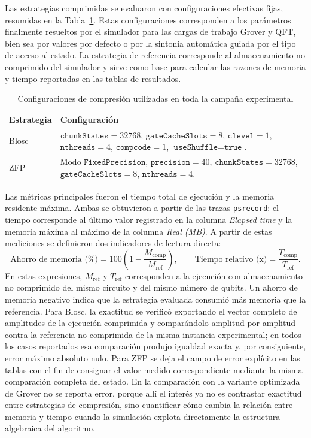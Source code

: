 Las estrategias comprimidas se evaluaron con configuraciones efectivas fijas, resumidas en la
Tabla~\ref{tab:exp-configs}. Estas configuraciones corresponden a los parámetros finalmente
resueltos por el simulador para las cargas de trabajo Grover y QFT, bien sea por valores por
defecto o por la sintonía automática guiada por el tipo de acceso al estado. La estrategia de referencia corresponde al almacenamiento no
comprimido del simulador y sirve como base para calcular las razones de memoria y tiempo
reportadas en las tablas de resultados.

\begin{table}[H]
    \centering
    \small
    \caption{Configuraciones de compresión utilizadas en toda la campaña experimental}
    \label{tab:exp-configs}
    \begin{tabular}{>{\raggedright\arraybackslash}p{2.1cm}>{\raggedright\arraybackslash}p{9.2cm}}
        \hline
        \textbf{Estrategia} & \textbf{Configuración} \\
        \hline
        Blosc & $\texttt{chunkStates}=32768$, $\texttt{gateCacheSlots}=8$, $\texttt{clevel}=1$, $\texttt{nthreads}=4$, $\texttt{compcode}=1$, $\texttt{useShuffle}=\texttt{true}$. \\
        ZFP & Modo $\texttt{FixedPrecision}$, $\texttt{precision}=40$, $\texttt{chunkStates}=32768$, $\texttt{gateCacheSlots}=8$, $\texttt{nthreads}=4$. \\
        \hline
    \end{tabular}
\end{table}

Las métricas principales fueron el tiempo total de ejecución y la memoria residente máxima.
Ambas se obtuvieron a partir de las trazas \texttt{psrecord}: el tiempo corresponde al último
valor registrado en la columna \textit{Elapsed time} y la memoria máxima al máximo de la
columna \textit{Real (MB)}. A partir de estas mediciones se definieron dos indicadores de
lectura directa:
\[
\text{Ahorro de memoria (\%)} = 100\left(1-\frac{M_{\text{comp}}}{M_{\text{ref}}}\right),
\qquad
\text{Tiempo relativo (x)} = \frac{T_{\text{comp}}}{T_{\text{ref}}}.
\]
En estas expresiones, $M_{\text{ref}}$ y $T_{\text{ref}}$ corresponden a la ejecución con
almacenamiento no comprimido del mismo circuito y del mismo número de qubits. Un ahorro de
memoria negativo indica que la estrategia evaluada consumió más memoria que la referencia.
Para Blosc, la exactitud se verificó exportando el vector completo de amplitudes de la
ejecución comprimida y comparándolo amplitud por amplitud contra la referencia no comprimida de la
misma instancia experimental; en todos los casos reportados esa comparación produjo igualdad
exacta y, por consiguiente, error máximo absoluto nulo. Para ZFP se deja el
campo de error explícito en las tablas con el fin de consignar el valor medido correspondiente
mediante la misma comparación completa del estado.
En la comparación con la variante optimizada de Grover no se reporta error, porque allí el
interés ya no es contrastar exactitud entre estrategias de compresión, sino cuantificar cómo
cambia la relación entre memoria y tiempo cuando la simulación explota directamente la
estructura algebraica del algoritmo.
